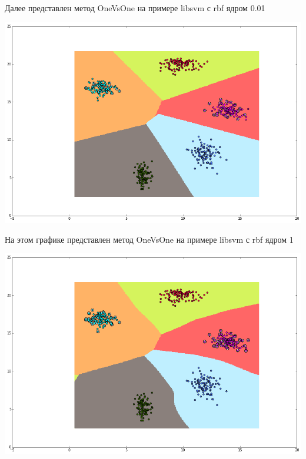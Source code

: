\documentclass[12pt, a4paper]{article}
\begin{document}
			Далее представлен метод OneVsOne на примере libsvm с rbf ядром 0.01
			\begin{center}
				\includegraphics[width=15cm]{6par_rbf1.png}
			\end{center}

			На этом графике представлен метод OneVsOne на примере libsvm с rbf ядром 1
			\begin{center}
				\includegraphics[width=15cm]{6par_rbf2.png}
			\end{center}

		\newpage
\end{document}
